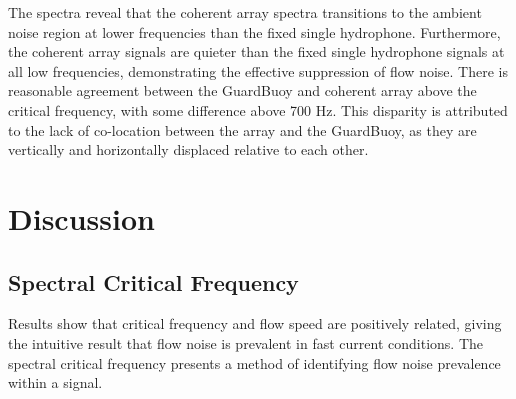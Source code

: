 \documentclass[12pt,journal,onecolumn]{IEEEtran}
\begin{document}
The spectra reveal that the coherent array spectra transitions to the ambient noise region at lower frequencies than the fixed single hydrophone. %
Furthermore, the coherent array signals are quieter than the fixed single hydrophone signals at all low frequencies, demonstrating the effective suppression of flow noise. %
There is reasonable agreement between the GuardBuoy and coherent array above the critical frequency, with some difference above 700 Hz. This disparity is attributed to the lack of co-location between the array and the GuardBuoy, as they are vertically and horizontally displaced relative to each other.%
\section{Discussion}



\subsection{Spectral Critical Frequency}

Results show that critical frequency and flow speed are positively related, giving the intuitive result that flow noise is prevalent in fast current conditions. %
The spectral critical frequency presents a method of identifying flow noise prevalence within a signal. %
\end{document}
